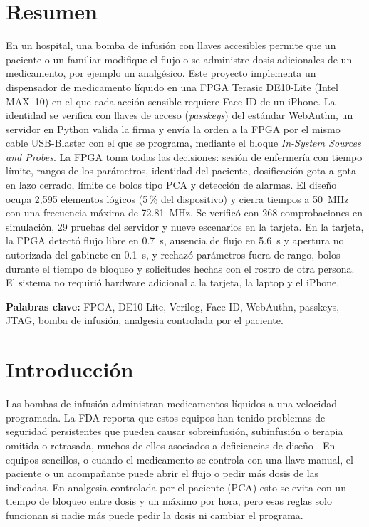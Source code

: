 \documentclass[11pt,letterpaper]{article}
\begin{document}
\section*{Resumen}
En un hospital, una bomba de infusión con llaves accesibles permite que un paciente o un familiar modifique el flujo o se administre dosis adicionales de un medicamento, por ejemplo un analgésico. Este proyecto implementa un dispensador de medicamento líquido en una FPGA Terasic DE10-Lite (Intel MAX~10) en el que cada acción sensible requiere Face ID de un iPhone. La identidad se verifica con llaves de acceso (\emph{passkeys}) del estándar WebAuthn, un servidor en Python valida la firma y envía la orden a la FPGA por el mismo cable USB-Blaster con el que se programa, mediante el bloque \emph{In-System Sources and Probes}. La FPGA toma todas las decisiones: sesión de enfermería con tiempo límite, rangos de los parámetros, identidad del paciente, dosificación gota a gota en lazo cerrado, límite de bolos tipo PCA y detección de alarmas. El diseño ocupa 2,595 elementos lógicos (5\,\% del dispositivo) y cierra tiempos a 50~MHz con una frecuencia máxima de 72.81~MHz. Se verificó con 268 comprobaciones en simulación, 29 pruebas del servidor y nueve escenarios en la tarjeta. En la tarjeta, la FPGA detectó flujo libre en 0.7~s, ausencia de flujo en 5.6~s y apertura no autorizada del gabinete en 0.1~s, y rechazó parámetros fuera de rango, bolos durante el tiempo de bloqueo y solicitudes hechas con el rostro de otra persona. El sistema no requirió hardware adicional a la tarjeta, la laptop y el iPhone.

\textbf{Palabras clave:} FPGA, DE10-Lite, Verilog, Face ID, WebAuthn, passkeys, JTAG, bomba de infusión, analgesia controlada por el paciente.

{\setlength{\parskip}{0pt}\tableofcontents}
\newpage

\section{Introducción}
Las bombas de infusión administran medicamentos líquidos a una velocidad programada. La FDA reporta que estos equipos han tenido problemas de seguridad persistentes que pueden causar sobreinfusión, subinfusión o terapia omitida o retrasada, muchos de ellos asociados a deficiencias de diseño \cite{fda_pumps}. En equipos sencillos, o cuando el medicamento se controla con una llave manual, el paciente o un acompañante puede abrir el flujo o pedir más dosis de las indicadas. En analgesia controlada por el paciente (PCA) esto se evita con un tiempo de bloqueo entre dosis y un máximo por hora, pero esas reglas solo funcionan si nadie más puede pedir la dosis ni cambiar el programa.
\end{document}
